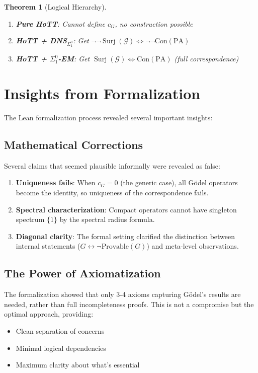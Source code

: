 \documentclass[11pt]{article}
\newtheorem{theorem}{Theorem}[section]
\theoremstyle{definition}
\newcommand{\SigOne}{\Sigma^{0}_{\!1}}
\newcommand{\PA}{\mathrm{PA}}
\newcommand{\Con}{\mathrm{Con}}
\DeclareMathOperator{\Surj}{Surj}
\begin{document}
\begin{theorem}[Logical Hierarchy]\label{thm:hierarchy}
\begin{enumerate}
\item \textbf{Pure HoTT}: Cannot define $c_G$, no construction possible
\item \textbf{HoTT + DNS$_{\SigOne}$}: Get $\neg\neg\Surj(\mathcal{G}) \iff \neg\neg\Con(\PA)$
\item \textbf{HoTT + $\SigOne$-EM}: Get $\Surj(\mathcal{G}) \iff \Con(\PA)$ (full correspondence)
\end{enumerate}
\end{theorem}

\section{Insights from Formalization}

The Lean formalization process revealed several important insights:

\subsection{Mathematical Corrections}

Several claims that seemed plausible informally were revealed as false:
\begin{enumerate}
\item \textbf{Uniqueness fails}: When $c_G = 0$ (the generic case), all Gödel operators become the identity, so uniqueness of the correspondence fails.
\item \textbf{Spectral characterization}: Compact operators cannot have singleton spectrum $\{1\}$ by the spectral radius formula.
\item \textbf{Diagonal clarity}: The formal setting clarified the distinction between internal statements ($G \leftrightarrow \neg\text{Provable}(G)$) and meta-level observations.
\end{enumerate}

\subsection{The Power of Axiomatization}

The formalization showed that only 3-4 axioms capturing Gödel's results are needed, rather than full incompleteness proofs. This is not a compromise but the optimal approach, providing:
\begin{itemize}
\item Clean separation of concerns
\item Minimal logical dependencies  
\item Maximum clarity about what's essential
\end{itemize}
\end{document}
